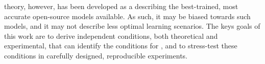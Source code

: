 \HTSR theory, however, has been developed as a \Phenomenology describing the best-trained, most accurate open-source models available.
As such, it may be biased towards such models, and it may not describe less optimal learning scenarios.
The keys goals of this work are to derive independent conditions, both theoretical and experimental, that can
identify the conditions for \IdealLearning, and to stress-test these conditions in carefully designed,
reproducible experiments.

